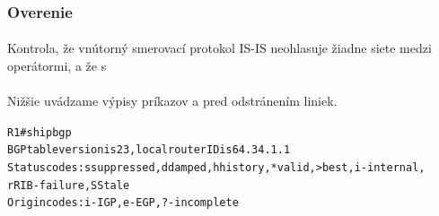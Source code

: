 \documentclass[12pt,twoside,a4paper]{report}
\begin{document}
\subsubsection{Overenie}
\paragraph{}
Kontrola, že vnútorný smerovací protokol IS-IS neohlasuje žiadne siete medzi operátormi, a že s

\paragraph{}
Nižšie uvádzame výpisy príkazov  a  pred odstránením liniek.

\noindent
{\selectfont
\begin{small}
\begin{alltt}
R1#sh ip bgp              
BGP table version is 23, local router ID is 64.34.1.1
Status codes: s suppressed, d damped, h history, * valid, > best, i - internal,
              r RIB-failure, S Stale
Origin codes: i - IGP, e - EGP, ? - incomplete


\end{alltt}
\end{small}}
\end{document}
